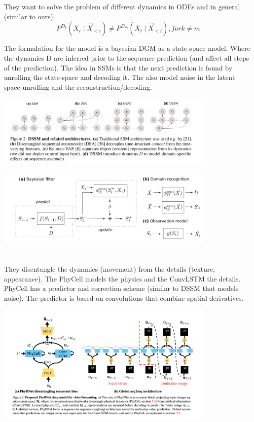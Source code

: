 \documentclass{article}
\newcommand{\citeall}[1]{\citeauthor{#1}}
\begin{document}
\section{\citeall{Miladinovic2019DisentangledRepresentations}}

They want to solve the problem of different dynamics in ODEs and in general (similar to ours). 
$$
P^{D_{k}}\left(X_{i} \mid \vec{X}_{<i}\right) \neq P^{D_{m}}\left(X_{i} \mid \vec{X}_{<i}\right), for k \neq m
$$

The formulation for the model is a bayesian DGM as a state-space model. Where the dynamics D are inferred prior to the sequence prediction (and affect all steps of the prediction). The idea in SSMs is that the next prediction is found by unrolling the state-space and decoding it. The also model noise in the latent space unrolling and the reconstruction/decoding.

\includegraphics[width=0.8\textwidth]{images/dssm.png}

\includegraphics[width=0.8\textwidth]{images/dssm2.png}

\section{\citeall{LeGuen2020DisentanglingPrediction}}

They disentangle the dynamics (movement) from the details (texture, appearance). The PhyCell models the physics and the ConvLSTM the details. PhyCell has a predictor and correction scheme (similar to DSSM that models noise). The predictor is based on convolutions that combine spatial derivatives. 

\includegraphics[width=0.8\textwidth]{images/phydnet.png}
\end{document}
